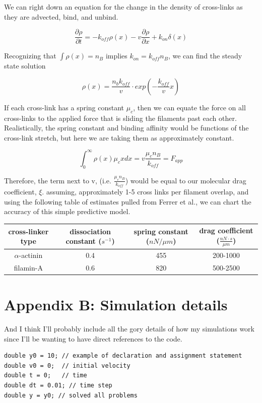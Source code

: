 \documentclass[prb,11pt]{revtex4-1}
\begin{document}
We can right down an equation for the change in the density of cross-links as they are advected, bind, and unbind.

\begin{equation}
\frac{\partial \rho}{\partial t} = -k_{off}\rho(x) - v\frac{\partial \rho}{\partial x} + k_{on}\delta(x)
\end{equation}

Recognizing that $\int \rho(x)=n_B$ implies $k_{on}=k_{off}n_B$, we can find the steady state solution

\begin{equation}
\rho(x) = \frac{n_b k_{off}}{v}\cdot exp\left ( -\frac{k_{off}}{v}x \right )
\end{equation}

If each cross-link has a spring constant $\mu_c$, then we can equate the force on all cross-links to the applied force that is sliding the filaments past each other.  Realistically, the spring constant and binding affinity would be functions of the cross-link stretch, but here we are taking them as approximately constant.

\begin{equation}
\int_{0}^{\infty}\rho(x)\mu_cx dx = v \frac{\mu_c n_B}{k_{off}}= F_{app}
\end{equation}

Therefore, the term next to v, (i.e. $\tfrac{\mu_c n_B}{k_{off}}$) would be equal to our molecular drag coefficient, $\xi$.  assuming, approximately 1-5 cross links per filament overlap, and using the following table of estimates pulled from Ferrer et al., we can chart the accuracy of this simple predictive model.

\begin{table}[h]
\begin{tabular}{c|c|c|c}
\textbf{cross-linker type} & \textbf{dissociation constant ($s^{-1}$)} & \textbf{spring constant ($nN / \mu m$)} & \textbf{drag coefficient ($\tfrac{nN \cdot s}{\mu m}$)} \\ \hline
$\alpha$-actinin & 0.4 & 455 & 200-1000 \\
filamin-A & 0.6 & 820 & 500-2500
\end{tabular}
\end{table}

\section{Appendix B: Simulation details}
And I think I'll probably include all the gory details of how my simulations work since I'll be wanting to have direct references to the code. 
\begin{verbatim}
double y0 = 10; // example of declaration and assignment statement
double v0 = 0;  // initial velocity
double t = 0;   // time
double dt = 0.01; // time step
double y = y0; // solved all problems
\end{verbatim}
\end{document}
